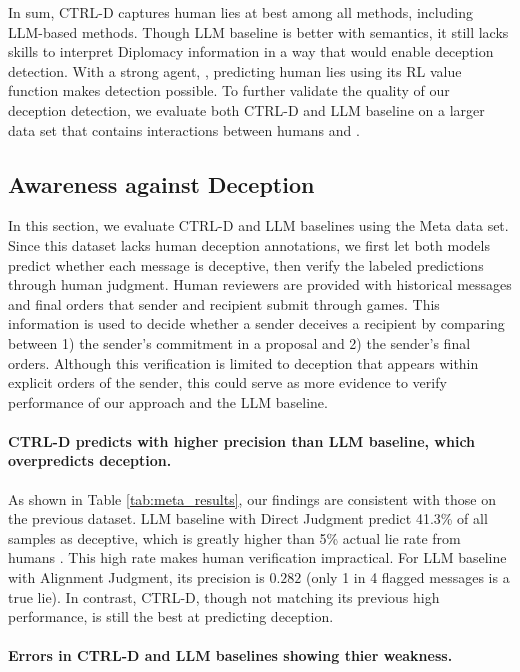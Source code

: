 In sum, CTRL-D captures human lies at best among all methods, including LLM-based methods. Though LLM baseline is better with semantics, it still lacks skills to interpret Diplomacy information in a way that would enable deception detection. With a strong agent, \cicero, predicting human lies using its RL value function makes detection possible. To further validate the quality of our deception detection, we evaluate both CTRL-D and LLM baseline on a larger data set that contains interactions between humans and \cicero.

\subsection{Awareness against Deception}
\label{sec:result_friction}

In this section, we evaluate CTRL-D and LLM baselines using the Meta data set. Since this dataset lacks human deception annotations, we first let both models predict whether each message is deceptive, then verify the labeled predictions through human judgment. Human reviewers are provided with historical messages and final orders that sender and recipient submit through games. This information is used to decide whether a sender deceives a recipient by comparing between 1) the sender's commitment in a proposal and 2) the sender's final orders. Although this verification is limited to deception that appears within explicit orders of the sender, this could serve as more evidence to verify performance of our approach and the LLM baseline. 

\paragraph{CTRL-D predicts with higher precision than LLM baseline, which overpredicts deception.} As shown in Table \ref{tab:meta_results}, our findings are consistent with those on the previous dataset. LLM baseline with Direct Judgment predict 41.3\% of all samples as deceptive, which is greatly higher than 5\% actual lie rate from humans \citep{peskov2020takes}. This high rate makes human verification impractical. For LLM baseline with Alignment Judgment, its precision is \(0.282\) (only 1 in 4 flagged messages is a true lie). In contrast, CTRL-D, though not matching its previous high performance, is still the best at predicting deception. 

\paragraph{Errors in CTRL-D and LLM baselines showing thier weakness.} 

